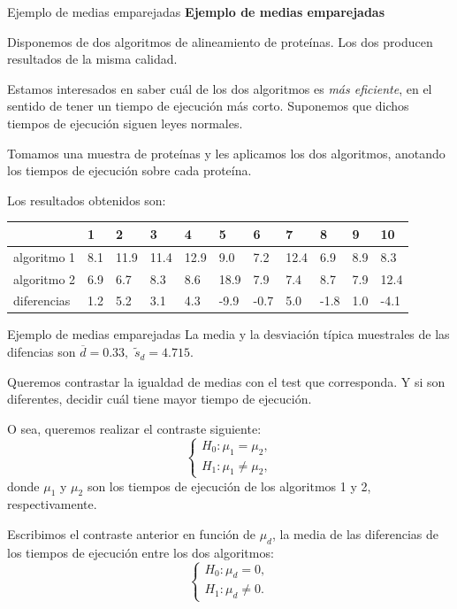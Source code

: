\documentclass[
  ignorenonframetext,
]{beamer}
\begin{document}
\begin{frame}{Ejemplo de medias emparejadas}
\protect\hypertarget{ejemplo-de-medias-emparejadas}{}
\textbf{Ejemplo de medias emparejadas}

Disponemos de dos algoritmos de alineamiento de proteínas. Los dos
producen resultados de la misma calidad.

Estamos interesados en saber cuál de los dos algoritmos es \emph{más
eficiente}, en el sentido de tener un tiempo de ejecución más corto.
Suponemos que dichos tiempos de ejecución siguen leyes normales.

Tomamos una muestra de proteínas y les aplicamos los dos algoritmos,
anotando los tiempos de ejecución sobre cada proteína.

Los resultados obtenidos son:

\begin{longtable}[]{@{}lllllllllll@{}}
\toprule
& 1 & 2 & 3 & 4 & 5 & 6 & 7 & 8 & 9 & 10\tabularnewline
\midrule
\endhead
algoritmo 1 & 8.1 & 11.9 & 11.4 & 12.9 & 9.0 & 7.2 & 12.4 & 6.9 & 8.9 &
8.3\tabularnewline
algoritmo 2 & 6.9 & 6.7 & 8.3 & 8.6 & 18.9 & 7.9 & 7.4 & 8.7 & 7.9 &
12.4\tabularnewline
diferencias & 1.2 & 5.2 & 3.1 & 4.3 & -9.9 & -0.7 & 5.0 & -1.8 & 1.0 &
-4.1\tabularnewline
\bottomrule
\end{longtable}
\end{frame}

\begin{frame}{Ejemplo de medias emparejadas}
\protect\hypertarget{ejemplo-de-medias-emparejadas-1}{}
La media y la desviación típica muestrales de las difencias son
\(\overline{d}=0.33,\) \(\tilde s_d = 4.715.\)

Queremos contrastar la igualdad de medias con el test que corresponda. Y
si son diferentes, decidir cuál tiene mayor tiempo de ejecución.

O sea, queremos realizar el contraste siguiente: \[
\left\{\begin{array}{l}
H_0:\mu_1=\mu_2,\\
H_1:\mu_1\neq \mu_2,
\end{array}\right.
\] donde \(\mu_1\) y \(\mu_2\) son los tiempos de ejecución de los
algoritmos 1 y 2, respectivamente.

Escribimos el contraste anterior en función de \(\mu_d\), la media de
las diferencias de los tiempos de ejecución entre los dos algoritmos: \[
\left\{\begin{array}{l}
H_0:\mu_d=0,\\
H_1:\mu_d\neq 0.
\end{array}\right.
\]
\end{frame}
\end{document}
